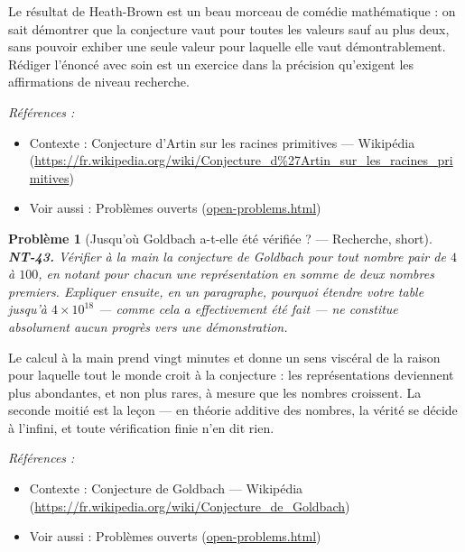 \documentclass[11pt]{article}
\newtheorem{problem}{Problème}
\newenvironment{refs}{\par\small\noindent\emph{Références :}\begin{itemize}\setlength\itemsep{0pt}}{\end{itemize}\normalsize}
\begin{document}
\noindent Le résultat de Heath-Brown est un beau morceau de comédie mathématique : on sait démontrer que la conjecture vaut pour toutes les valeurs sauf au plus deux, sans pouvoir exhiber une seule valeur pour laquelle elle vaut démontrablement. Rédiger l'énoncé avec soin est un exercice dans la précision qu'exigent les affirmations de niveau recherche.

\begin{refs}
\item Contexte : Conjecture d'Artin sur les racines primitives --- Wikipédia (\url{https://fr.wikipedia.org/wiki/Conjecture_d%27Artin_sur_les_racines_primitives})
\item Voir aussi : Problèmes ouverts (\url{open-problems.html})
\end{refs}

\bigskip

\begin{problem}[{Jusqu'où Goldbach a-t-elle été vérifiée ? --- Recherche, short}]
\textbf{NT-43.} Vérifier à la main la conjecture de Goldbach pour tout nombre pair de $ 4 $ à $ 100 $, en notant pour chacun une représentation en somme de deux nombres premiers. Expliquer ensuite, en un paragraphe, pourquoi étendre votre table jusqu'à $ 4 \times 10^{18} $ --- comme cela a effectivement été fait --- ne constitue absolument aucun progrès vers une démonstration.
\end{problem}

\noindent Le calcul à la main prend vingt minutes et donne un sens viscéral de la raison pour laquelle tout le monde croit à la conjecture : les représentations deviennent plus abondantes, et non plus rares, à mesure que les nombres croissent. La seconde moitié est la leçon --- en théorie additive des nombres, la vérité se décide à l'infini, et toute vérification finie n'en dit rien.

\begin{refs}
\item Contexte : Conjecture de Goldbach --- Wikipédia (\url{https://fr.wikipedia.org/wiki/Conjecture_de_Goldbach})
\item Voir aussi : Problèmes ouverts (\url{open-problems.html})
\end{refs}

\bigskip
\end{document}
